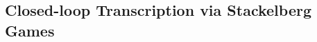 \documentclass[../../book-main.tex]{subfiles}
\begin{document}

\subsection{Closed-loop Transcription via Stackelberg Games}\label{sec:closed-loop-transcription}


\end{document}

